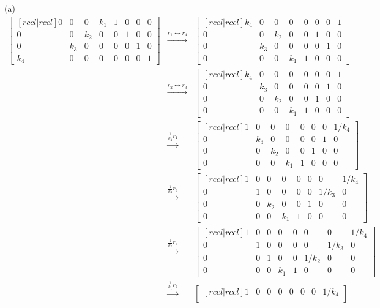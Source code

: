 \begin{solution}
(a) 
\begin{eqnarray*}
\begin{bmatrix}[rccl|rccl]
0&0&0&k_1&1&0&0&0\\
0&0&k_2&0&0&1&0&0\\
0&k_3&0&0&0&0&1&0\\
k_4&0&0&0&0&0&0&1
\end{bmatrix}
&\xrightarrow[]{r_1 \leftrightarrow r_4}&
\begin{bmatrix}[rccl|rccl]
k_4&0&0&0&0&0&0&1\\
0&0&k_2&0&0&1&0&0\\
0&k_3&0&0&0&0&1&0\\
0&0&0&k_1&1&0&0&0
\end{bmatrix}\\
&\xrightarrow[]{r_2 \leftrightarrow r_3}&
\begin{bmatrix}[rccl|rccl]
k_4&0&0&0&0&0&0&1\\
0&k_3&0&0&0&0&1&0\\
0&0&k_2&0&0&1&0&0\\
0&0&0&k_1&1&0&0&0
\end{bmatrix}\\
&\xrightarrow[]{\frac{1}{k_4}r_1}&
\begin{bmatrix}[rccl|rccl]
1&0&0&0&0&0&0&1/k_4\\
0&k_3&0&0&0&0&1&0\\
0&0&k_2&0&0&1&0&0\\
0&0&0&k_1&1&0&0&0
\end{bmatrix}\\
&\xrightarrow[]{\frac{1}{k_3}r_2}&
\begin{bmatrix}[rccl|rccl]
1&0&0&0&0&0&0&1/k_4\\
0&1&0&0&0&0&1/k_3&0\\
0&0&k_2&0&0&1&0&0\\
0&0&0&k_1&1&0&0&0
\end{bmatrix}\\
&\xrightarrow[]{\frac{1}{k_2}r_3}&
\begin{bmatrix}[rccl|rccl]
1&0&0&0&0&0&0&1/k_4\\
0&1&0&0&0&0&1/k_3&0\\
0&0&1&0&0&1/k_2&0&0\\
0&0&0&k_1&1&0&0&0
\end{bmatrix}\\
&\xrightarrow[]{\frac{1}{k_1}r_4}&
\begin{bmatrix}[rccl|rccl]
1&0&0&0&0&0&0&1/k_4\\

\end{bmatrix}
\end{eqnarray*}
\end{solution}
